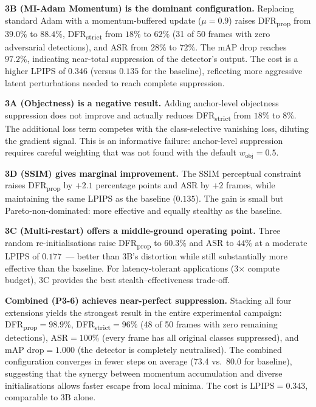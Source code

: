 \documentclass[12pt,a4paper]{report}
\begin{document}
\textbf{3B (MI-Adam Momentum) is the dominant configuration.}
Replacing standard Adam with a momentum-buffered update ($\mu = 0.9$)
raises DFR\textsubscript{prop} from $39.0\%$ to $88.4\%$, DFR\textsubscript{strict}
from $18\%$ to $62\%$ (31 of 50 frames with zero adversarial detections), and ASR
from $28\%$ to $72\%$. The mAP drop reaches $97.2\%$, indicating near-total
suppression of the detector's output. The cost is a higher LPIPS of $0.346$
(versus $0.135$ for the baseline), reflecting more aggressive latent
perturbations needed to reach complete suppression.

\textbf{3A (Objectness) is a negative result.}
Adding anchor-level objectness suppression does not improve and actually
reduces DFR\textsubscript{strict} from $18\%$ to $8\%$. The additional loss
term competes with the class-selective vanishing loss, diluting the gradient
signal. This is an informative failure: anchor-level suppression requires
careful weighting that was not found with the default $w_{\text{obj}} = 0.5$.

\textbf{3D (SSIM) gives marginal improvement.}
The SSIM perceptual constraint raises DFR\textsubscript{prop} by $+2.1$
percentage points and ASR by $+2$ frames, while maintaining the same
LPIPS as the baseline ($0.135$). The gain is small but Pareto-non-dominated:
more effective and equally stealthy as the baseline.

\textbf{3C (Multi-restart) offers a middle-ground operating point.}
Three random re-initialisations raise DFR\textsubscript{prop} to $60.3\%$
and ASR to $44\%$ at a moderate LPIPS of $0.177$~--- better than 3B's
distortion while still substantially more effective than the baseline.
For latency-tolerant applications (3$\times$ compute budget), 3C provides
the best stealth--effectiveness trade-off.

\textbf{Combined (P3-6) achieves near-perfect suppression.}
Stacking all four extensions yields the strongest result in the entire
experimental campaign: DFR\textsubscript{prop}$=98.9\%$,
DFR\textsubscript{strict}$=96\%$ (48 of 50 frames with zero remaining
detections), ASR$=100\%$ (every frame has all original classes suppressed),
and mAP drop$=1.000$ (the detector is completely neutralised).
The combined configuration converges in fewer steps on average (73.4 vs.\
80.0 for baseline), suggesting that the synergy between momentum accumulation
and diverse initialisations allows faster escape from local minima.
The cost is LPIPS$=0.343$, comparable to 3B alone.
\end{document}
